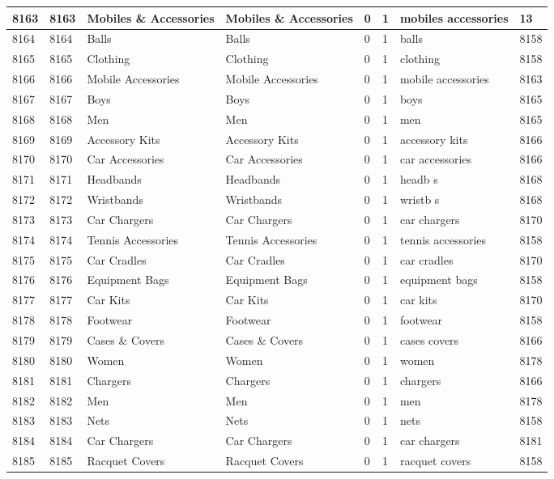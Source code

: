 \begin{longtable}{|l|l|l|l|l|l|l|l|}
8163 & 8163 & Mobiles \& Accessories & Mobiles \& Accessories & 0 & 1 & mobiles accessories & 13 \\ \hline 
8164 & 8164 & Balls & Balls & 0 & 1 & balls & 8158 \\ \hline 
8165 & 8165 & Clothing & Clothing & 0 & 1 & clothing & 8158 \\ \hline 
8166 & 8166 & Mobile Accessories & Mobile Accessories & 0 & 1 & mobile accessories & 8163 \\ \hline 
8167 & 8167 & Boys & Boys & 0 & 1 & boys & 8165 \\ \hline 
8168 & 8168 & Men & Men & 0 & 1 & men & 8165 \\ \hline 
8169 & 8169 & Accessory Kits & Accessory Kits & 0 & 1 & accessory kits & 8166 \\ \hline 
8170 & 8170 & Car Accessories & Car Accessories & 0 & 1 & car accessories & 8166 \\ \hline 
8171 & 8171 & Headbands & Headbands & 0 & 1 & headb s & 8168 \\ \hline 
8172 & 8172 & Wristbands & Wristbands & 0 & 1 & wristb s & 8168 \\ \hline 
8173 & 8173 & Car Chargers & Car Chargers & 0 & 1 & car chargers & 8170 \\ \hline 
8174 & 8174 & Tennis Accessories & Tennis Accessories & 0 & 1 & tennis accessories & 8158 \\ \hline 
8175 & 8175 & Car Cradles & Car Cradles & 0 & 1 & car cradles & 8170 \\ \hline 
8176 & 8176 & Equipment Bags & Equipment Bags & 0 & 1 & equipment bags & 8158 \\ \hline 
8177 & 8177 & Car Kits & Car Kits & 0 & 1 & car kits & 8170 \\ \hline 
8178 & 8178 & Footwear & Footwear & 0 & 1 & footwear & 8158 \\ \hline 
8179 & 8179 & Cases \& Covers & Cases \& Covers & 0 & 1 & cases covers & 8166 \\ \hline 
8180 & 8180 & Women & Women & 0 & 1 & women & 8178 \\ \hline 
8181 & 8181 & Chargers & Chargers & 0 & 1 & chargers & 8166 \\ \hline 
8182 & 8182 & Men & Men & 0 & 1 & men & 8178 \\ \hline 
8183 & 8183 & Nets & Nets & 0 & 1 & nets & 8158 \\ \hline 
8184 & 8184 & Car Chargers & Car Chargers & 0 & 1 & car chargers & 8181 \\ \hline 
8185 & 8185 & Racquet Covers & Racquet Covers & 0 & 1 & racquet covers & 8158 \\ \hline 

\end{longtable}
